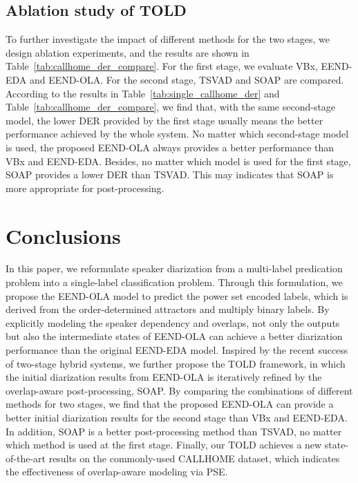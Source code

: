 \documentclass{article}
\begin{document}
\subsection{Ablation study of TOLD}
To further investigate the impact of different methods for the two stages, we design ablation experiments, and the results are shown in Table~\ref{tab:callhome_der_compare}. For the first stage, we evaluate VBx, EEND-EDA and EEND-OLA. For the second stage, TSVAD and SOAP are compared. 
According to the results in Table~\ref{tab:single_callhome_der} and Table~\ref{tab:callhome_der_compare}, we find that, with the same second-stage model, the lower DER provided by the first stage usually means the better performance achieved by the whole system. No matter which second-stage model is used, the proposed EEND-OLA always provides a better performance than VBx and EEND-EDA.
Besides, no matter which model is used for the first stage, SOAP provides a lower DER than TSVAD. This may indicates that SOAP is more appropriate for post-processing.

\section{Conclusions}
In this paper, we reformulate speaker diarization from a multi-label predication problem into a single-label classification problem. Through this formulation, we propose the EEND-OLA model to predict the power set encoded labels, which is derived from the order-determined attractors and multiply binary labels. By explicitly modeling the speaker dependency and overlaps, not only the outputs but also the intermediate states of EEND-OLA can achieve a better diarization performance than the original EEND-EDA model.
Inspired by the recent success of two-stage hybrid systems, we further propose the TOLD framework, in which the initial diarization results from EEND-OLA is iteratively refined by the overlap-aware post-processing, SOAP. 
By comparing the combinations of different methods for two stages, we find that the proposed EEND-OLA can provide a better initial diarization results for the second stage than VBx and EEND-EDA. In addition, SOAP is a better post-processing method than TSVAD, no matter which method is used at the first stage.
Finally, our TOLD achieves a new state-of-the-art results on the commonly-used CALLHOME dataset, which indicates the effectiveness of overlap-aware modeling via PSE.




\end{document}
